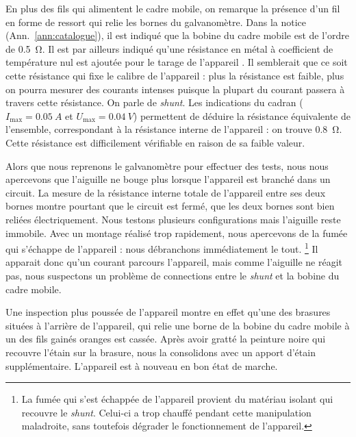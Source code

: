 \documentclass[12pt,a4paper,fleqn]{article}
\begin{document}
En plus des fils qui alimentent le cadre mobile, on remarque la présence d'un fil en forme de ressort qui relie les bornes du galvanomètre.
Dans la notice (Ann.~\ref{ann:catalogue}), il est indiqué que la bobine du cadre mobile est de l'ordre de \SI{0.5}{\ohm}.
Il est par ailleurs indiqué qu'\og une résistance en métal à coefficient de température nul est ajoutée pour le tarage de l'appareil \fg{}.
Il semblerait que ce soit cette résistance qui fixe le calibre de l'appareil : plus la résistance est faible, plus on pourra mesurer des courants intenses puisque la plupart du courant passera à travers cette résistance.
On parle de \emph{shunt}.
Les indications du cadran ($I_\mathrm{max}=\SI{0.05}{A}$ et $U_\mathrm{max}=\SI{0.04}{V}$) permettent de déduire la résistance équivalente de l'ensemble, correspondant à la résistance interne de l'appareil : on trouve \SI{0.8}{\ohm}.
Cette résistance est difficilement vérifiable en raison de sa faible valeur.

Alors que nous reprenons le galvanomètre pour effectuer des tests, nous nous apercevons que l'aiguille ne bouge plus lorsque l'appareil est branché dans un circuit.
La mesure de la résistance interne totale de l'appareil entre ses deux bornes montre pourtant que le circuit est fermé, que les deux bornes sont bien reliées électriquement.
Nous testons plusieurs configurations mais l'aiguille reste immobile.
Avec un montage réalisé trop rapidement, nous apercevons de la fumée qui s'échappe de l'appareil : nous débranchons immédiatement le tout.
\footnote{La fumée qui s'est échappée de l'appareil provient du matériau isolant qui recouvre le \emph{shunt}.
Celui-ci a trop chauffé pendant cette manipulation maladroite, sans toutefois dégrader le fonctionnement de l'appareil.}
Il apparait donc qu'un courant parcours l'appareil, mais comme l'aiguille ne réagit pas, nous suspectons un problème de connections entre le \emph{shunt} et la bobine du cadre mobile.

Une inspection plus poussée de l'appareil montre en effet qu'une des brasures situées à l'arrière de l'appareil, qui relie une borne de la bobine du cadre mobile à un des fils gainés oranges est cassée.
Après avoir gratté la peinture noire qui recouvre l'étain sur la brasure, nous la consolidons avec un apport d'étain supplémentaire.
L'appareil est à nouveau en bon état de marche.
\end{document}
